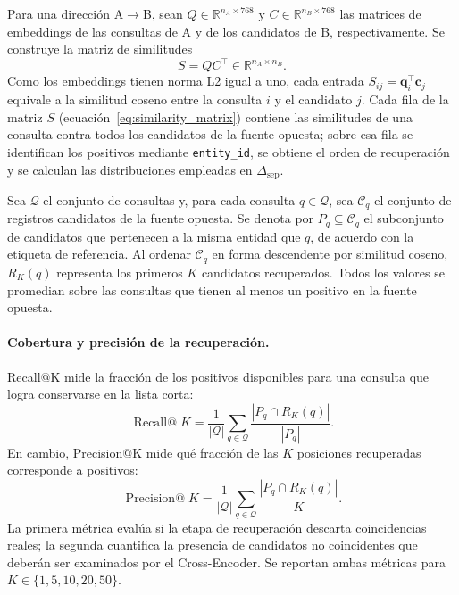 Para una dirección A$\rightarrow$B, sean $Q \in \mathbb{R}^{n_A \times 768}$ y $C \in \mathbb{R}^{n_B \times 768}$ las matrices de embeddings de las consultas de A y de los candidatos de B, respectivamente. Se construye la matriz de similitudes
\begin{equation}
    S = QC^{\top} \in \mathbb{R}^{n_A \times n_B}.
    \label{eq:similarity_matrix}
\end{equation}
Como los embeddings tienen norma L2 igual a uno, cada entrada $S_{ij}=\mathbf{q}_i^{\top}\mathbf{c}_j$ equivale a la similitud coseno entre la consulta $i$ y el candidato $j$. Cada fila de la matriz $S$ (ecuación~\ref{eq:similarity_matrix}) contiene las similitudes de una consulta contra todos los candidatos de la fuente opuesta; sobre esa fila se identifican los positivos mediante \texttt{entity\_id}, se obtiene el orden de recuperación y se calculan las distribuciones empleadas en $\Delta_{\mathrm{sep}}$.

Sea $\mathcal{Q}$ el conjunto de consultas y, para cada consulta $q \in \mathcal{Q}$, sea $\mathcal{C}_q$ el conjunto de registros candidatos de la fuente opuesta. Se denota por $P_q \subseteq \mathcal{C}_q$ el subconjunto de candidatos que pertenecen a la misma entidad que $q$, de acuerdo con la etiqueta de referencia. Al ordenar $\mathcal{C}_q$ en forma descendente por similitud coseno, $R_K(q)$ representa los primeros $K$ candidatos recuperados. Todos los valores se promedian sobre las consultas que tienen al menos un positivo en la fuente opuesta.

\paragraph{Cobertura y precisión de la recuperación.}
Recall@K mide la fracción de los positivos disponibles para una consulta que logra conservarse en la lista corta:
\begin{equation}
    \operatorname{Recall@}K = \frac{1}{|\mathcal{Q}|}\sum_{q \in \mathcal{Q}}
    \frac{|P_q \cap R_K(q)|}{|P_q|}.
    \label{eq:recall_at_k}
\end{equation}
En cambio, Precision@K mide qué fracción de las $K$ posiciones recuperadas corresponde a positivos:
\begin{equation}
    \operatorname{Precision@}K = \frac{1}{|\mathcal{Q}|}\sum_{q \in \mathcal{Q}}
    \frac{|P_q \cap R_K(q)|}{K}.
    \label{eq:precision_at_k}
\end{equation}
La primera métrica evalúa si la etapa de recuperación descarta coincidencias reales; la segunda cuantifica la presencia de candidatos no coincidentes que deberán ser examinados por el Cross-Encoder. Se reportan ambas métricas para $K \in \{1, 5, 10, 20, 50\}$.

